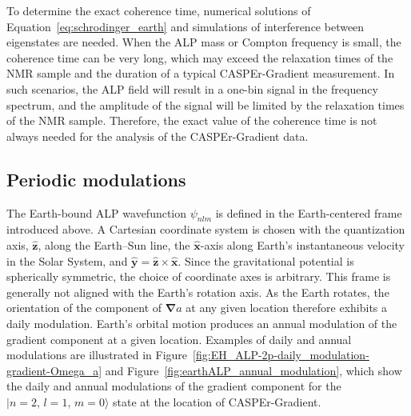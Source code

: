 To determine the exact coherence time, numerical solutions of Equation~\eqref{eq:schrodinger_earth} and simulations of interference between eigenstates are needed.
When the ALP mass or Compton frequency is small, the coherence time can be very long, which may exceed the relaxation times of the NMR sample and the duration of a typical CASPEr-Gradient measurement.
In such scenarios, the ALP field will result in a one-bin signal in the frequency spectrum, and the amplitude of the signal will be limited by the relaxation times of the NMR sample.
Therefore, the exact value of the coherence time is not always needed for the analysis of the CASPEr-Gradient data.


\subsection{Periodic modulations}\label{sec:theory:earthALP:periodic}

The Earth-bound ALP wavefunction $\psi_{nlm}$ is defined in the Earth-centered frame introduced above.
A Cartesian coordinate system is chosen with the quantization axis,
$\hat{\boldsymbol{z}}$, along the Earth--Sun line, the $\hat{\boldsymbol{x}}$-axis along Earth's instantaneous velocity in the Solar System, and $\hat{\boldsymbol{y}}=\hat{\boldsymbol{z}}\times\hat{\boldsymbol{x}}$.
Since the gravitational potential is spherically symmetric, the choice of coordinate axes is arbitrary.
This frame is generally not aligned with the Earth's rotation axis.
As the Earth rotates, the orientation of the component of $\boldsymbol{\nabla}a$ at any given location therefore exhibits a daily modulation.
Earth's orbital motion produces an annual modulation of the gradient component at a given location.
Examples of daily and annual modulations are illustrated in Figure~\ref{fig:EH_ALP-2p-daily_modulation-gradient-Omega_a} and Figure~\ref{fig:earthALP_annual_modulation}, which show the daily and annual modulations of the gradient component for the $|n=2,\,l=1,\, m=0\rangle$ state at the location of CASPEr-Gradient.

